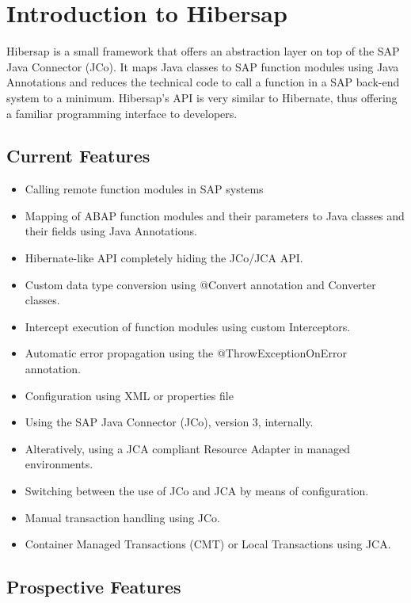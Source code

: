 \chapter{Introduction to Hibersap}

  Hibersap is a small framework that offers an abstraction layer on top of the SAP Java Connector (JCo).
  It maps Java classes to SAP function modules using Java Annotations and reduces the technical code
  to call a function in a SAP back-end system to a minimum. 
  Hibersap's API is very similar to Hibernate, thus offering a familiar programming interface to developers.  

\section*{Current Features}

\begin{itemize}
  \item Calling remote function modules in SAP systems
  \item Mapping of ABAP function modules and their parameters to Java classes and their fields using Java Annotations.
  \item Hibernate-like API completely hiding the JCo/JCA API.
  \item Custom data type conversion using @Convert annotation and Converter classes.
  \item Intercept execution of function modules using custom Interceptors.
  \item Automatic error propagation using the @ThrowExceptionOnError annotation.
  \item Configuration using XML or properties file
  \item Using the SAP Java Connector (JCo), version 3, internally.
  \item Alteratively, using a JCA compliant Resource Adapter in managed environments.
  \item Switching between the use of JCo and JCA by means of configuration.
  \item Manual transaction handling using JCo.
  \item Container Managed Transactions (CMT) or Local Transactions using JCA.
\end{itemize}


\section*{Prospective Features}

